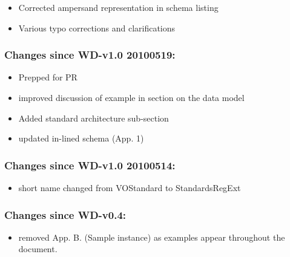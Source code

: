 \documentclass[11pt,a4paper]{ivoa}
\begin{document}
\begin{itemize}

\item Corrected ampersand representation in schema listing

\item Various typo corrections and clarifications

\end{itemize}

\subsubsection{Changes since WD-v1.0 20100519:}

\begin{itemize}

\item  Prepped for PR 

\item  improved discussion of example in section on the data model

\item  Added standard architecture sub-section

\item  updated in-lined schema (App. 1)

\end{itemize}

\subsubsection{Changes since WD-v1.0 20100514:}

\begin{itemize}

\item  short name changed from VOStandard to StandardsRegExt

\end{itemize}

\subsubsection{Changes since WD-v0.4:}

\begin{itemize}

\item  removed App. B. (Sample instance) as examples appear throughout
       the document.

\end{itemize}


\end{document}
